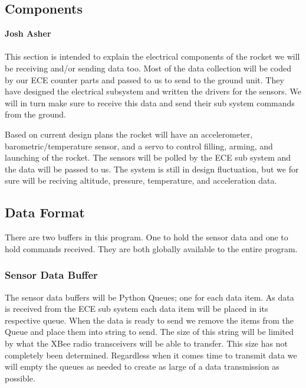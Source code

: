 \documentclass[10pt,draftclsnofoot,onecolumn,compsoc]{IEEEtran}
\begin{document}
\subsection{Components} 

{\bf Josh Asher}
\\ \\
This section is intended to explain the electrical components of the rocket we will be receiving and/or sending data too. Most of the data collection will be coded by our ECE counter parts and passed to us to send to the ground unit. They have designed the electrical subsystem and written the drivers for the sensors. We will in turn make sure to receive this data and send their sub system commands from the ground. \par
Based on current design plans the rocket will have an accelerometer, barometric/temperature sensor, and a servo to control filling, arming, and launching of the rocket. The sensors will be polled by the ECE sub system and the data will be passed to us. The system is still in design fluctuation, but we for sure will be reciving altitude, pressure, temperature, and acceleration data.\par

\subsection{Data Format}
There are two buffers in this program. One to hold the sensor data and one to hold commands received. They are both globally available to the entire program.
\subsubsection{Sensor Data Buffer}
The sensor data buffers will be Python Queues; one for each data item. As data is received from the ECE sub system each data item will be placed in its respective queue. When the data is ready to send we remove the items from the Queue and place them into string to send. The size of this string will be limited by what the XBee radio transceivers will be able to transfer. This size has not completely been determined. Regardless when it comes time to transmit data we will empty the queues as needed to create as large of a data transmission as possible.
\end{document}
